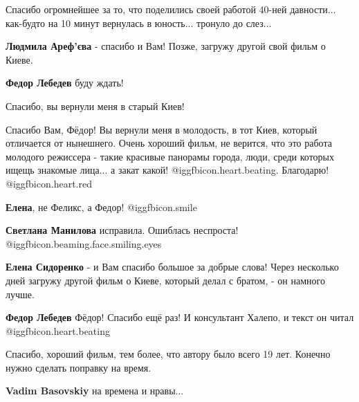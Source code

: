  
 
 
 
 
\zzSecCmt

\begin{itemize} %

Спасибо огромнейшее за то, что поделились своей работой 40-ней
давности... как-будто на 10 минут вернулась в юность... тронуло до слез...

\textbf{Людмила Ареф'єва} - спасибо и Вам! Позже, загружу другой свой фильм о Киеве.

\textbf{Федор Лебедев} буду ждать!

Спасибо, вы вернули меня в старый Киев!


Спасибо Вам, Фёдор! Вы вернули меня в молодость, в тот Киев, который отличается от
нынешнего. Очень хороший фильм, не верится, что это работа молодого
режиссера - такие красивые панорамы города, люди, среди которых ищещь знакомые
лица... а закат какой! @igg{fbicon.heart.beating}. Благодарю! @igg{fbicon.heart.red}

\textbf{Елена}, не Феликс, а Федор! @igg{fbicon.smile} 

\textbf{Светлана Манилова} исправила. Ошиблась неспроста! @igg{fbicon.beaming.face.smiling.eyes} 

\textbf{Елена Сидоренко} - и Вам спасибо большое за добрые слова! Через несколько дней загружу другой фильм о Киеве, который делал с братом, - он намного лучше.

\textbf{Федор Лебедев} Фёдор! Спасибо ещё раз! И консультант Халепо, и текст он читал @igg{fbicon.heart.beating} 

Спасибо, хороший фильм, тем более, что автору было всего 19 лет. Конечно нужно сделать поправку на время.

\textbf{Vadim Basovskiy} на времена и нравы...



\end{itemize}
